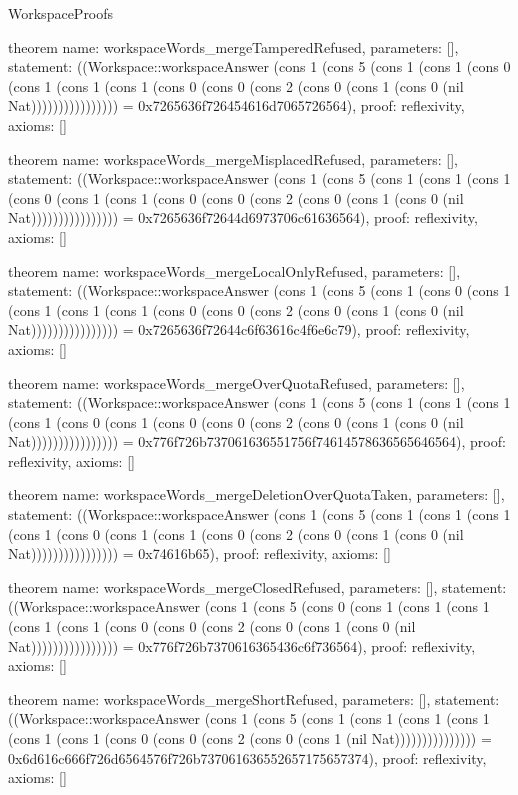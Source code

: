 \begin{lexlean}{WorkspaceProofs}
\begin{semanticmodule}
theorem{
  name: workspaceWords_mergeTamperedRefused,
  parameters: [],
  statement: ((Workspace::workspaceAnswer (cons 1 (cons 5 (cons 1 (cons 1 (cons 0 (cons 1 (cons 1 (cons 1 (cons 0 (cons 0 (cons 2 (cons 0 (cons 1 (cons 0 (nil Nat)))))))))))))))) = 0x7265636f726454616d7065726564),
  proof: reflexivity{},
  axioms: []
}

theorem{
  name: workspaceWords_mergeMisplacedRefused,
  parameters: [],
  statement: ((Workspace::workspaceAnswer (cons 1 (cons 5 (cons 1 (cons 1 (cons 1 (cons 0 (cons 1 (cons 1 (cons 0 (cons 0 (cons 2 (cons 0 (cons 1 (cons 0 (nil Nat)))))))))))))))) = 0x7265636f72644d6973706c61636564),
  proof: reflexivity{},
  axioms: []
}

theorem{
  name: workspaceWords_mergeLocalOnlyRefused,
  parameters: [],
  statement: ((Workspace::workspaceAnswer (cons 1 (cons 5 (cons 1 (cons 0 (cons 1 (cons 1 (cons 1 (cons 1 (cons 0 (cons 0 (cons 2 (cons 0 (cons 1 (cons 0 (nil Nat)))))))))))))))) = 0x7265636f72644c6f63616c4f6e6c79),
  proof: reflexivity{},
  axioms: []
}

theorem{
  name: workspaceWords_mergeOverQuotaRefused,
  parameters: [],
  statement: ((Workspace::workspaceAnswer (cons 1 (cons 5 (cons 1 (cons 1 (cons 1 (cons 1 (cons 0 (cons 1 (cons 0 (cons 0 (cons 2 (cons 0 (cons 1 (cons 0 (nil Nat)))))))))))))))) = 0x776f726b737061636551756f74614578636565646564),
  proof: reflexivity{},
  axioms: []
}

theorem{
  name: workspaceWords_mergeDeletionOverQuotaTaken,
  parameters: [],
  statement: ((Workspace::workspaceAnswer (cons 1 (cons 5 (cons 1 (cons 1 (cons 1 (cons 1 (cons 0 (cons 1 (cons 1 (cons 0 (cons 2 (cons 0 (cons 1 (cons 0 (nil Nat)))))))))))))))) = 0x74616b65),
  proof: reflexivity{},
  axioms: []
}

theorem{
  name: workspaceWords_mergeClosedRefused,
  parameters: [],
  statement: ((Workspace::workspaceAnswer (cons 1 (cons 5 (cons 0 (cons 1 (cons 1 (cons 1 (cons 1 (cons 1 (cons 0 (cons 0 (cons 2 (cons 0 (cons 1 (cons 0 (nil Nat)))))))))))))))) = 0x776f726b7370616365436c6f736564),
  proof: reflexivity{},
  axioms: []
}

theorem{
  name: workspaceWords_mergeShortRefused,
  parameters: [],
  statement: ((Workspace::workspaceAnswer (cons 1 (cons 5 (cons 1 (cons 1 (cons 1 (cons 1 (cons 1 (cons 1 (cons 0 (cons 0 (cons 2 (cons 0 (cons 1 (nil Nat))))))))))))))) = 0x6d616c666f726d6564576f726b737061636552657175657374),
  proof: reflexivity{},
  axioms: []
}
\end{semanticmodule}
\end{lexlean}
